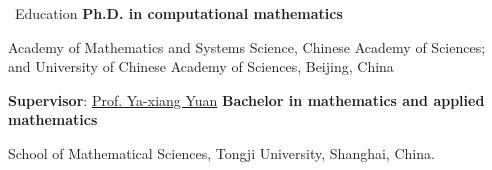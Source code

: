 \begin{rubric}{\faGraduationCap\ Education}
%
\entry*[2021.09 -- 2026.06]%
    \textbf{Ph.D. in computational mathematics}\par
    Academy of Mathematics and Systems Science, Chinese Academy of Sciences; and University of Chinese Academy of Sciences, Beijing, China\par
    \textbf{Supervisor}: \href{https://lsec.cc.ac.cn/~yyx/index.html}{Prof. Ya-xiang Yuan}
% 
\entry*[2017.09 -- 2021.07]%
    \textbf{Bachelor in mathematics and applied mathematics}\par
    School of Mathematical Sciences, Tongji University, Shanghai, China.
\end{rubric}
